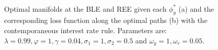 \def\CTeXPreproc{Created by ctex v0.2.5, don't edit!}\documentclass[12pt]{article}
\numberwithin{equation}{section}
\begin{document}
\begin{figure}
    \begin{center}
        \mbox{\quad
        }
   \end{center}
   \caption{\label{optbench} Optimal manifolds at the BLE and REE given each $\phi_y^*$ (a) and the corresponding loss function along the optimal paths (b) with the contemporaneous interest rate rule. Parameters are: $\lambda=0.99, \varphi=1, \gamma=0.04,\sigma_1=1,\sigma_2=0.5$ and $\omega_y=1,\omega_r=0.05$.}
    \end{figure}


\newpage
\end{document}
